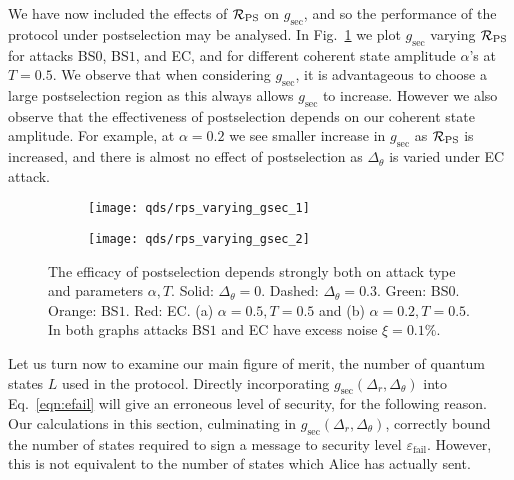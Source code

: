 We have now included the effects of $\mathcal{R}_{\text{PS}}$ on $g_{\text{sec}}$, and so the performance of the protocol under postselection may be analysed. In Fig.~\ref{fig:qds_gsec_varying_rps} we plot $g_{\text{sec}}$ varying $\mathcal{R}_{\text{PS}}$ for attacks BS$0$, BS$1$, and EC, and for different coherent state amplitude $\alpha$'s at $T=0.5$. We observe that when considering $g_{\text{sec}}$, it is advantageous to choose a large postselection region as this always allows $g_{\text{sec}}$ to increase. However we also observe that the effectiveness of postselection depends on our coherent state amplitude. For example, at $\alpha=0.2$ we see smaller increase in $g_{\text{sec}}$ as $\mathcal{R}_{\text{PS}}$ is increased, and there is almost no effect of postselection as $\Delta_\theta$ is varied under EC attack.


\begin{figure}[htp]
\captionsetup{width=0.8\linewidth}
\centering
	\begin{subfigure}{0.7\linewidth}
		\centering
		\caption{}
		\texttt{[image: qds/rps\_varying\_gsec\_1]}
	\end{subfigure}
	\begin{subfigure}{0.7\linewidth}
		\centering
		\caption{}
		\texttt{[image: qds/rps\_varying\_gsec\_2]}
	\end{subfigure}
\caption{\label{fig:qds_gsec_varying_rps} The efficacy of postselection depends strongly both on attack type and parameters $\alpha, T$. Solid: $\Delta_\theta = 0$. Dashed: $\Delta_\theta = 0.3$. Green: BS$0$. Orange: BS$1$.  Red: EC. (a) $\alpha = 0.5, T=0.5$ and (b) $\alpha = 0.2, T=0.5$. In both graphs attacks BS$1$ and EC have excess noise $\xi = 0.1\%$.  }
\end{figure}


Let us turn now to examine our main figure of merit, the number of quantum states $L$ used in the protocol. Directly incorporating $g_{\text{sec}}\left(\Delta_r, \Delta_\theta\right)$ into Eq.~\ref{eqn:efail} will give an erroneous level of security, for the following reason. Our calculations in this section, culminating in $g_{\text{sec}}\left(\Delta_r, \Delta_\theta\right)$, correctly bound the number of states required to sign a message to security level $\varepsilon_{\text{fail}}$. However, this is not equivalent to the number of states which Alice has actually sent. 

